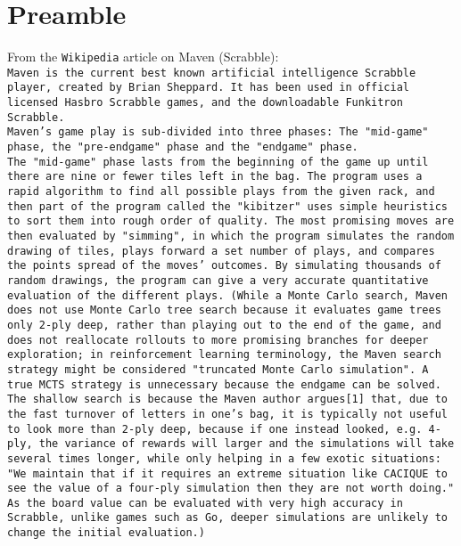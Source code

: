 \documentclass{42-en}
\begin{document}
\chapter{Preamble}

From the \texttt{Wikipedia} article on Maven (Scrabble):\\

\texttt{Maven is the current best known artificial intelligence Scrabble player, created by Brian Sheppard. It has been used in official licensed Hasbro Scrabble games, and the downloadable Funkitron Scrabble.}\\

\texttt{Maven's game play is sub-divided into three phases: The "mid-game" phase, the "pre-endgame" phase and the "endgame" phase.}\\

\texttt{The "mid-game" phase lasts from the beginning of the game up until there are nine or fewer tiles left in the bag. The program uses a rapid algorithm to find all possible plays from the given rack, and then part of the program called the "kibitzer" uses simple heuristics to sort them into rough order of quality. The most promising moves are then evaluated by "simming", in which the program simulates the random drawing of tiles, plays forward a set number of plays, and compares the points spread of the moves' outcomes. By simulating thousands of random drawings, the program can give a very accurate quantitative evaluation of the different plays. (While a Monte Carlo search, Maven does not use Monte Carlo tree search because it evaluates game trees only 2-ply deep, rather than playing out to the end of the game, and does not reallocate rollouts to more promising branches for deeper exploration; in reinforcement learning terminology, the Maven search strategy might be considered "truncated Monte Carlo simulation". A true MCTS strategy is unnecessary because the endgame can be solved. The shallow search is because the Maven author argues[1] that, due to the fast turnover of letters in one's bag, it is typically not useful to look more than 2-ply deep, because if one instead looked, e.g. 4-ply, the variance of rewards will larger and the simulations will take several times longer, while only helping in a few exotic situations: "We maintain that if it requires an extreme situation like CACIQUE to see the value of a four-ply simulation then they are not worth doing." As the board value can be evaluated with very high accuracy in Scrabble, unlike games such as Go, deeper simulations are unlikely to change the initial evaluation.)}\\
\end{document}

